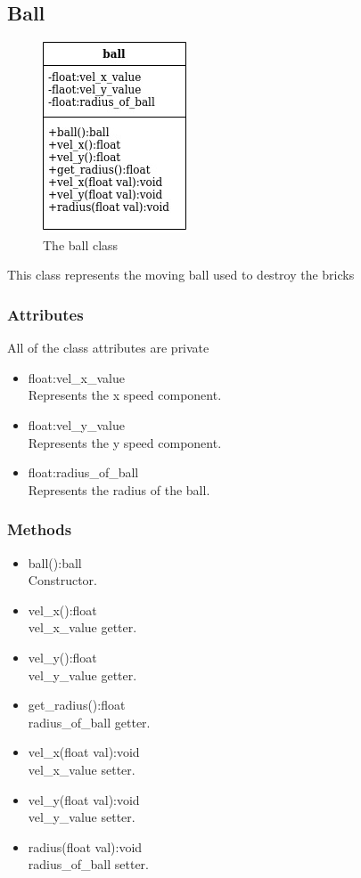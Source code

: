 \documentclass[]{article}
\begin{document}
\subsection{Ball}
\begin{figure}[h!]
    \centering
    \includegraphics[scale=0.5]{ball.jpg}
    \caption{The ball class}
    \label{fig:ball class diagram }
\end{figure}
This class represents the moving ball used to destroy the bricks
\subsubsection{Attributes}
All of the class attributes are private
	\begin{itemize}
		\item float:vel\_x\_value\\ Represents the x speed component.
		\item float:vel\_y\_value\\ Represents the y speed component.
		\item float:radius\_of\_ball\\ Represents the radius of the ball. 
	\end{itemize}
\subsubsection{Methods}
	\begin{itemize}
		\item ball():ball \\Constructor.
		\item vel\_x():float \\vel\_x\_value getter.
		\item vel\_y():float\\vel\_y\_value getter.
		\item get\_radius():float\\ radius\_of\_ball getter.
		\item vel\_x(float val):void \\ vel\_x\_value setter.
		\item vel\_y(float val):void \\vel\_y\_value setter.
		\item radius(float val):void \\ radius\_of\_ball setter.
	\end{itemize}
\end{document}
